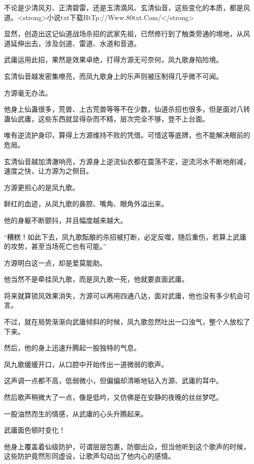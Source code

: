 
\begin{this_body}

不论是少清风刃、正清碧雷，还是玉清滴风、玄清仙音，这些变化的本质，都是风道。<strong>小说txt下载HtTp://Www.80txt.Com/</strong>

显然，创造出这记仙道战场杀招的武家先祖，已然修行到了触类旁通的境地，从风道延伸出去，涉及剑道、雷道、水道和音道。

武庸运用此招，果然是效果卓绝，打得方源无可奈何，凤九歌身陷险境。

玄清仙音越发密集嘹亮，而凤九歌身上的乐声则被压制得几乎微不可闻。

方源毫无办法。

他身上仙蛊很多，荒兽、上古荒兽等等不在少数，仙道杀招也很多，但是面对八转蛊仙武庸，这些东西就显得杂而不精，层次完全不够，登不上台面。

唯有逆流护身印，算得上方源维持不败的凭借。可惜这等底牌，也不能解决眼前的危局。

玄清仙音越加清澈响亮，方源身上逆流仙衣都在震荡不定，逆流河水不断地削减，速度之快，让方源为之侧目。

方源更担心的是凤九歌。

鲜红的血迹，从凤九歌的鼻腔、嘴角、眼角外溢出来。

他的身躯不断颤抖，并且幅度越来越大。

“糟糕！如此下去，凤九歌酝酿的杀招被打断，必定反噬，随后重伤，若算上武庸的攻势，甚至当场死亡也有可能。”

方源明白这一点，却是爱莫能助。

他当然不是牵挂凤九歌，而是凤九歌一死，他就要直面武庸。

将来就算锁风效果消失，方源可以再用四通八达，面对武庸，他也没有多少机会可言。

不过，就在局势渐渐向武庸倾斜的时候，凤九歌忽然吐出一口浊气，整个人放松了下来。

然后，他的身上迅速升腾起一股独特的气息。

凤九歌缓缓开口，从口腔中开始传出一道微弱的歌声。

这声调一点都不高，低弱微小，但偏偏却清晰地钻入方源、武庸的耳中。

然后歌声稍微大了一点，像是低吟，又仿佛是在安静的夜晚的丝丝梦呓。

一股油然而生的情感，从武庸的心头升腾起来。

武庸面色顿时变化！

他身上覆盖着仙级防护，可谓层层包裹，防御出众，但当他听到这个歌声的时候，这些防护竟然形同虚设，让歌声勾动出了他内心的感情。


\end{this_body}
